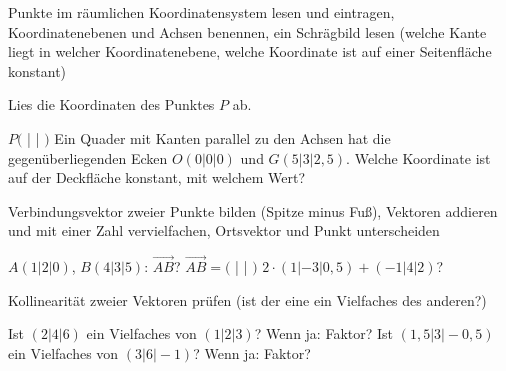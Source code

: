 \setcounter{aufgabe}{0}

\begin{aufgabe}{Punkte im räumlichen Koordinatensystem lesen und eintragen, Koordinatenebenen und Achsen benennen, ein Schrägbild lesen (welche Kante liegt in welcher Koordinatenebene, welche Koordinate ist auf einer Seitenfläche konstant)}
\begin{teile}
\teil Lies die Koordinaten des Punktes $P$ ab.

\begin{ksys3}[xyz]\end{ksys3}
$P($ \leerfeld | \leerfeld | \leerfeld $)$
\teil Ein Quader mit Kanten parallel zu den Achsen hat die gegenüberliegenden Ecken $O(0 | 0 | 0)$ und $G(5 | 3 | 2{,}5)$. Welche Koordinate ist auf der Deckfläche konstant, mit welchem Wert?
\end{teile}
\end{aufgabe}

\begin{aufgabe}{Verbindungsvektor zweier Punkte bilden (Spitze minus Fuß), Vektoren addieren und mit einer Zahl vervielfachen, Ortsvektor und Punkt unterscheiden}
\begin{teile}
\teil $A(1 | 2 | 0)$, $B(4 | 3 | 5)$: $\overrightarrow{AB}$? $\overrightarrow{AB} = ($ \leerfeld | \leerfeld | \leerfeld $)$
\teil $2 \cdot (1 | -3 | 0{,}5) + (-1 | 4 | 2)$?
\end{teile}
\end{aufgabe}

\begin{aufgabe}{Kollinearität zweier Vektoren prüfen (ist der eine ein Vielfaches des anderen?)}
\begin{teile}
\teil Ist $(2 | 4 | 6)$ ein Vielfaches von $(1 | 2 | 3)$? Wenn ja: Faktor?
\teil Ist $(1{,}5 | 3 | -0{,}5)$ ein Vielfaches von $(3 | 6 | -1)$? Wenn ja: Faktor?
\end{teile}
\end{aufgabe}

